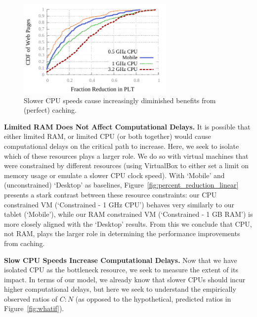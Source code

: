 \begin{figure}[t]
    \includegraphics[width=3in]{../graphs/percent_plt_reduction/percent_reduction_linear_CPU_comparison.pdf}
    \caption[]{\label{fig:plt_cpu_comparison}Slower CPU speeds cause increasingly diminished benefits from (perfect) caching.}
\end{figure}
{\bf Limited RAM Does Not Affect Computational Delays.}
It is possible that either limited RAM, or limited CPU (or both together) would cause computational delays on the critical path to increase.
Here, we seek to isolate which of these resources plays a larger role.
We do so with virtual machines that were constrained by different resources (using VirtualBox to either set a limit on memory usage or emulate a slower CPU clock speed).
With `Mobile' and (unconstrained) `Desktop' as baselines, Figure~\ref{fig:percent_reduction_linear} presents a stark contrast between these resource constraints:
our CPU constrained VM (`Constrained - 1 GHz CPU') behaves very
similarly to our tablet (`Mobile'), while our RAM constrained VM (`Constrained - 1 GB RAM') is more closely aligned with the `Desktop' results.
From this we conclude that CPU, not RAM, plays the larger role in determining the performance improvements from caching.


{\bf Slow CPU Speeds Increase Computational Delays.}
Now that we have isolated CPU as the bottleneck resource, we seek to measure
the extent of its impact. In terms of our model, we already know that slower
CPUs should incur higher computational delays, but here we seek to understand
the empirically observed ratios of $C:N$ (as opposed to the hypothetical,
predicted ratios in Figure~\ref{fig:whatif}).

